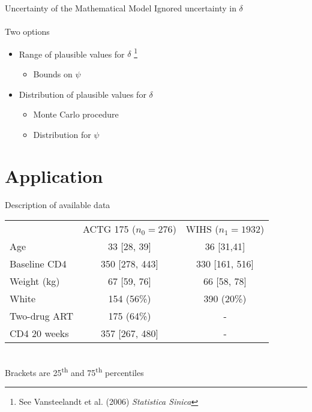\documentclass{beamer}
\begin{document}
\begin{frame}{Uncertainty of the Mathematical Model}
	Ignored uncertainty in $\delta$
	\\~\\
	Two options
	\begin{itemize}
		\item[1.] Range of plausible values for $\delta$ \footnote[frame]{See Vansteelandt et al. (2006) \textit{Statistica Sinica}}
		\begin{itemize}
			\item Bounds on $\psi$
		\end{itemize}
		\item[2.] Distribution of plausible values for $\delta$
		\begin{itemize}
			\item Monte Carlo procedure
			\item Distribution for $\psi$
		\end{itemize}
	\end{itemize}
\end{frame}

\section{Application}

\begin{frame}{Description of available data}
	\begin{table}
		\centering
		\begin{tabular}{lcc} 
			\hline
			& ACTG 175 ($n_0 = 276$) & WIHS ($n_1 = 1932$)  \\ 
			\cline{2-3}
			Age                     & 33 [28, 39]               & 36 [31,41]              \\
			Baseline CD4 & 350 [278, 443]            & 330 [161, 516]          \\
			Weight (kg)             & 67 [59, 76]               & 66 [58, 78]             \\
			White                   				       & 154 (56\%)                & 390 (20\%)              \\
			Two-drug ART          					& 175 (64\%)                & -                       \\
			CD4 20 weeks                & 357 [267, 480]            & -                       \\
			\hline
		\end{tabular}
	\end{table}
	~\\
	Brackets are 25\textsuperscript{th} and 75\textsuperscript{th} percentiles
\end{frame}
\end{document}
